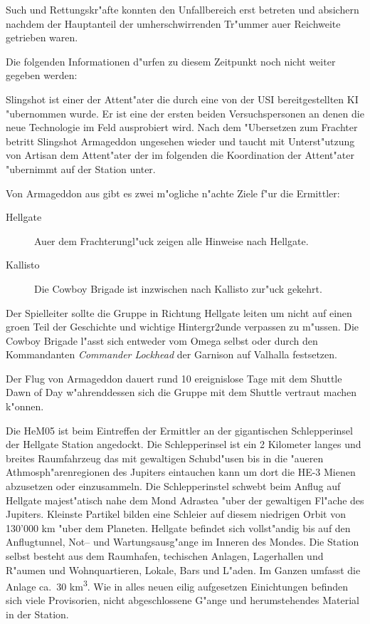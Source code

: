 Such und Rettungskr"afte konnten den Unfallbereich erst betreten und absichern nachdem der Hauptanteil der umherschwirrenden Tr"ummer au\3er Reichweite getrieben waren.

\begin{remarks}
	Die folgenden Informationen d"urfen zu diesem Zeitpunkt noch nicht weiter gegeben werden:
	
	Slingshot ist einer der Attent"ater die durch eine von der USI bereitgestellten KI "ubernommen wurde. Er ist eine der ersten beiden Versuchspersonen an denen die neue Technologie im Feld ausprobiert wird. Nach dem "Ubersetzen zum Frachter betritt Slingshot Armageddon ungesehen wieder und taucht mit Unterst"utzung von Artisan dem Attent"ater der im folgenden die Koordination der Attent"ater "ubernimmt auf der Station unter.
\end{remarks}


Von Armageddon aus gibt es zwei m"ogliche n"achte Ziele f"ur die Ermittler:

\begin{description}
	\item [Hellgate] Au\3er dem Frachterungl"uck zeigen alle Hinweise nach Hellgate.
	\item [Kallisto] Die Cowboy Brigade ist inzwischen nach Kallisto zur"uck gekehrt.
\end{description}

Der Spielleiter sollte die Gruppe in Richtung Hellgate leiten um nicht auf einen gro\3en Teil der Geschichte und wichtige Hintergr2unde verpassen zu m"ussen. Die Cowboy Brigade l"asst sich entweder vom Omega selbst oder durch den Kommandanten \textit{Commander Lockhead} der Garnison auf Valhalla festsetzen.



Der Flug von Armageddon dauert rund 10 ereignislose Tage  mit dem Shuttle Dawn of Day w"ahrenddessen sich die Gruppe mit dem Shuttle vertraut machen k"onnen. 

Die HeM05 ist beim Eintreffen der Ermittler an der gigantischen Schlepperinsel der Hellgate Station angedockt. Die Schlepperinsel ist ein 2 Kilometer langes und breites Raumfahrzeug das mit gewaltigen Schubd"usen bis in die "au\3eren Athmosph"arenregionen des Jupiters eintauchen kann um dort die HE-3 Mienen abzusetzen oder einzusammeln. Die Schlepperinstel schwebt beim Anflug auf Hellgate majest"atisch nahe dem Mond Adrastea "uber der gewaltigen Fl"ache des Jupiters. Kleinste Partikel bilden eine Schleier auf diesem niedrigen Orbit von 130'000 km "uber dem Planeten. Hellgate befindet sich vollst"andig bis auf den Anflugtunnel, Not-- und Wartungsausg"ange im Inneren des Mondes. Die Station selbst besteht aus dem Raumhafen, techischen Anlagen, Lagerhallen und R"aumen und Wohnquartieren, Lokale, Bars und L"aden. Im Ganzen umfasst die Anlage ca.~30 km\textsuperscript{3}. Wie in alles neuen eilig aufgesetzen Einichtungen befinden sich viele Provisorien, nicht abgeschlossene G"ange und herumstehendes Material in der Station.

